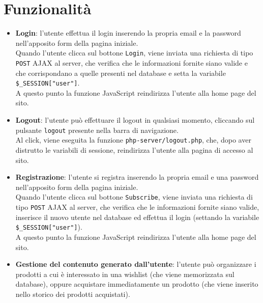 \section{Funzionalità}
\begin{itemize}
    \item \textbf{Login}: l'utente effettua il login inserendo la propria email e la password nell'apposito form della pagina iniziale.\\
    Quando l'utente clicca sul bottone \texttt{Login}, viene inviata una richiesta di tipo \texttt{POST} AJAX al server, che verifica che le informazioni fornite siano valide e che corrispondano a quelle presenti nel database e setta la variabile \texttt{\$\_SESSION["user"]}.\\
    A questo punto la funzione JavaScript reindirizza l'utente alla home page del sito.
    \item \textbf{Logout}: l'utente può effettuare il logout in qualsiasi momento, cliccando sul pulsante \texttt{logout} presente nella barra di navigazione.\\
    Al click, viene eseguita la funzione \texttt{php-server/logout.php}, che, dopo aver distrutto le variabili di sessione, reindirizza l'utente alla pagina di accesso al sito.
    \item \textbf{Registrazione}: l'utente si registra inserendo la propria email e una password nell'apposito form della pagina iniziale.\\
    Quando l'utente clicca sul bottone \texttt{Subscribe}, viene inviata una richiesta di tipo \texttt{POST} AJAX al server, che verifica che le informazioni fornite siano valide, inserisce il nuovo utente nel database ed effettua il login (settando la variabile \texttt{\$\_SESSION["user"]}).\\
    A questo punto la funzione JavaScript reindirizza l'utente alla home page del sito.
    \item \textbf{Gestione del contenuto generato dall'utente}: l'utente può organizzare i prodotti a cui è interessato in una wishlist (che viene memorizzata sul database), oppure acquistare immediatamente un prodotto (che viene inserito nello storico dei prodotti acquistati). 
\end{itemize}